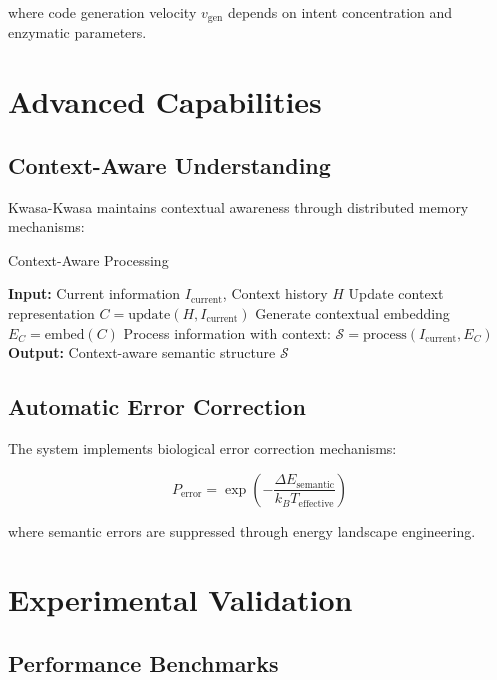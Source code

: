 \documentclass[12pt,a4paper]{article}
\begin{document}
where code generation velocity $v_{\text{gen}}$ depends on intent concentration and enzymatic parameters.

\section{Advanced Capabilities}

\subsection{Context-Aware Understanding}

Kwasa-Kwasa maintains contextual awareness through distributed memory mechanisms:

\begin{algorithm}
\caption{Context-Aware Processing}
\begin{algorithmic}[1]
\STATE \textbf{Input:} Current information $I_{\text{current}}$, Context history $H$
\STATE Update context representation $C = \text{update}(H, I_{\text{current}})$
\STATE Generate contextual embedding $E_C = \text{embed}(C)$
\STATE Process information with context: $\mathcal{S} = \text{process}(I_{\text{current}}, E_C)$
\STATE \textbf{Output:} Context-aware semantic structure $\mathcal{S}$
\end{algorithmic}
\end{algorithm}

\subsection{Automatic Error Correction}

The system implements biological error correction mechanisms:

\begin{equation}
P_{\text{error}} = \exp\left(-\frac{\Delta E_{\text{semantic}}}{k_B T_{\text{effective}}}\right)
\end{equation}

where semantic errors are suppressed through energy landscape engineering.

\section{Experimental Validation}

\subsection{Performance Benchmarks}
\end{document}
